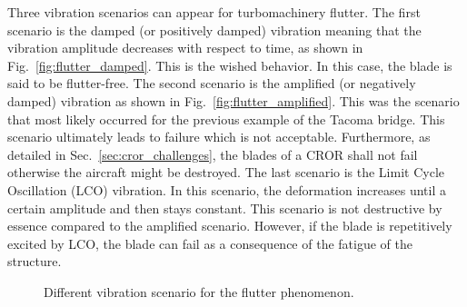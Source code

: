 Three vibration scenarios can appear for turbomachinery flutter.
The first scenario is the damped (or positively damped) 
vibration meaning
that the vibration amplitude decreases with respect to time, 
as shown in Fig.~\ref{fig:flutter_damped}.
This is the wished behavior. In this case, the blade is said to
be flutter-free.
The second scenario is the amplified (or negatively damped)
vibration as shown in Fig.~\ref{fig:flutter_amplified}. 
This was the scenario that most likely occurred for the
previous example of the Tacoma bridge. This scenario ultimately
leads to failure which is not acceptable. Furthermore, as
detailed in Sec.~\ref{sec:cror_challenges}, the blades of 
a CROR shall not fail otherwise the aircraft might
be destroyed.
The last scenario is the Limit Cycle Oscillation (LCO) vibration.
In this scenario, the deformation increases until a certain 
amplitude and then stays constant. This scenario is not
destructive by essence compared to the amplified scenario. However,
if the blade is repetitively excited by LCO, the blade
can fail as a consequence of the fatigue of the structure.
\begin{figure}[htb]
  \centering
  \caption{Different vibration scenario for the flutter phenomenon.}
\end{figure}



